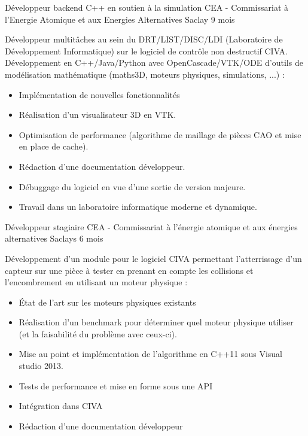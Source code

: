 \documentclass[11pt,a4paper,sans]{moderncv} %
\begin{document}

{Développeur backend C++ en soutien à la simulation}
{CEA - Commissariat à l'Energie Atomique et aux Energies Alternatives}
{Saclay}
{9 mois}
{Développeur multitâches au sein du DRT/LIST/DISC/LDI (Laboratoire de Développement Informatique) sur le logiciel de contrôle non destructif CIVA.
Développement en C++/Java/Python avec OpenCascade/VTK/ODE d'outils de modélisation mathématique (maths3D, moteurs physiques, simulations, ...) :
\begin{itemize}
\item Implémentation de nouvelles fonctionnalités
\item Réalisation d'un visualisateur 3D en VTK.
\item Optimisation de performance (algorithme de maillage de pièces CAO et mise en place de cache).
\item Rédaction d'une documentation développeur.
\item Débuggage du logiciel en vue d'une sortie de version majeure.
\item Travail dans un laboratoire informatique moderne et dynamique.
\end{itemize}}


{Développeur stagiaire}
{CEA - Commissariat à l'énergie atomique et aux énergies alternatives}
{Saclays}
{6 mois}
{Développement d’un module pour le logiciel CIVA permettant l’atterrissage d’un capteur sur une pièce à tester en prenant en compte les collisions et l’encombrement en utilisant un moteur physique :
\begin{itemize}
\item \'{E}tat de l’art sur les moteurs physiques existants
\item Réalisation d’un benchmark pour déterminer quel moteur physique utiliser (et la faisabilité du problème avec ceux-ci).
\item Mise au point et implémentation de l’algorithme en C++11 sous Visual studio 2013.
\item Tests de performance et mise en forme sous une API
\item Intégration dans CIVA
\item Rédaction d’une documentation développeur
\end{itemize}}

\end{document}
